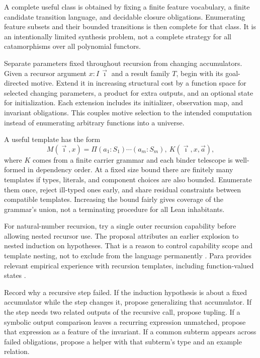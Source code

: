 A complete useful class is obtained by fixing a finite feature vocabulary,
a finite candidate transition language, and decidable closure obligations.
Enumerating feature subsets and their bounded transitions is then complete
for that class. It is an intentionally limited synthesis problem, not a
complete strategy for all catamorphisms over all polynomial functors.


Separate parameters fixed throughout recursion from changing accumulators.
Given a recursor argument $x:I\,\vec\imath$ and a result family $T$, begin with
its goal-directed motive. Extend it in increasing structural cost by a
function space for selected changing parameters, a product for extra outputs,
and an optional state for initialization. Each extension includes its
initializer, observation map, and invariant obligations. This couples motive
selection to the intended computation instead of enumerating arbitrary
functions into a universe.

A useful template has the form
\[
 M(\vec\imath,x)=\Pi (a_1:S_1)\cdots(a_m:S_m),\ K(\vec\imath,x,\vec a),
\]
where $K$ comes from a finite carrier grammar and each binder telescope is
well-formed in dependency order. At a fixed size bound there are finitely
many templates if types, literals, and component choices are also bounded.
Enumerate them once, reject ill-typed ones early, and share residual
constraints between compatible templates. Increasing the bound fairly gives
coverage of the grammar's union, not a terminating procedure for all Lean
inhabitants.

For natural-number recursion, try a single outer recursion capability before
allowing nested recursor use. The proposal attributes an earlier explosion to
nested induction on hypotheses. That is a reason to control capability scope
and template nesting, not to exclude  from the language permanently
\cite{implementation}. Para provides relevant empirical experience with
recursion templates, including function-valued states \cite{para}.


Record why a recursive step failed. If the induction hypothesis is about a
fixed accumulator while the step changes it, propose generalizing that
accumulator. If the step needs two related outputs of the recursive call,
propose tupling. If a symbolic output comparison leaves a recurring expression
unmatched, propose that expression as a feature of the invariant. If a common
subterm appears across failed obligations, propose a helper with that subterm's
type and an example relation.

